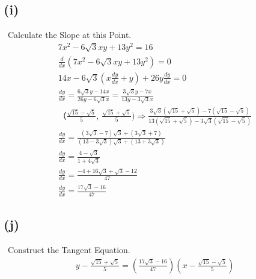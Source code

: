 \documentclass[12pt]{article}
\newcommand{\ddx}{\frac{d}{dx}}
\newcommand{\dydx}{\frac{dy}{dx}}
\begin{document}
\subsection{(i)} \, Calculate the Slope at this Point.
\begin{gather*}
    7x^2-6\sqrt{3}xy+13y^2=16\\
    \ddx(7x^2-6\sqrt{3}xy+13y^2)=0\\
    14x-6\sqrt{3}(x\dydx+y)+26y\dydx=0\\
    \dydx=\frac{6\sqrt{3}y-14x}{26y-6\sqrt{3}x}=\frac{3\sqrt{3}y-7x}{13y-3\sqrt{3}x}\\
    （\frac{\sqrt{15}-\sqrt{5}}{5},\ \frac{\sqrt{15}+\sqrt{5}}{5})\Rightarrow
    \frac{3\sqrt{3}(\sqrt{15}+\sqrt{5}) - 7(\sqrt{15}-\sqrt{5})}
{13(\sqrt{15}+\sqrt{5}) - 3\sqrt{3}(\sqrt{15}-\sqrt{5})}\\
\dydx=\frac{(3\sqrt{3}-7)\sqrt{3}+(3\sqrt{3}+7)}{(13-3\sqrt{3})\sqrt{3}+(13+3\sqrt{3})}\\
\dydx=\frac{4-\sqrt{3}}{1+4\sqrt{3}}\\
\dydx=\frac{-4+16\sqrt{3}+\sqrt{3}-12}{47}\\
\boxed{\dydx=\frac{17\sqrt{3}-16}{47}}
\end{gather*}

\subsection{(j)} \, Construct the Tangent Equation. 
\begin{gather*}
    \boxed{y-\frac{\sqrt{15}+\sqrt{5}}{5}=(\frac{17\sqrt{3}-16}{47})(x-\frac{\sqrt{15}-\sqrt{5}}{5})}
\end{gather*}
\end{document}
